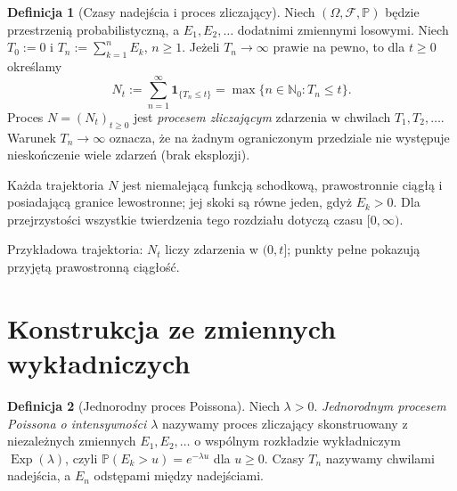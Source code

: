 \documentclass[11pt,a4paper,oneside]{report}
\numberwithin{equation}{chapter}
\theoremstyle{plain}
\theoremstyle{definition}
\newtheorem{definicja}{Definicja}[chapter]
\theoremstyle{remark}
\newcommand{\N}{\mathbb{N}}
\newcommand{\Prob}{\mathbb{P}}
\newcommand{\calF}{\mathcal{F}}
\newcommand{\ind}[1]{\mathbf{1}_{#1}}
\begin{document}
\begin{definicja}[Czasy nadejścia i proces zliczający]
Niech $(\Omega,\calF,\Prob)$ będzie przestrzenią probabilistyczną,
a $E_1,E_2,\ldots$ dodatnimi zmiennymi losowymi. Niech
$T_0:=0$ i $T_n:=\sum_{k=1}^n E_k$, $n\ge1$.
Jeżeli $T_n\to\infty$ prawie na pewno, to dla $t\ge0$ określamy
\[
N_t:=\sum_{n=1}^\infty\ind{\{T_n\le t\}}
      =\max\{n\in\N_0:T_n\le t\}.
\]
Proces $N=(N_t)_{t\ge0}$ jest \emph{procesem zliczającym} zdarzenia
w chwilach $T_1,T_2,\ldots$. Warunek $T_n\to\infty$ oznacza, że na
żadnym ograniczonym przedziale nie występuje nieskończenie wiele
zdarzeń (brak eksplozji).
\end{definicja}

Każda trajektoria $N$ jest niemalejącą funkcją schodkową, prawostronnie
ciągłą i posiadającą granice lewostronne; jej skoki są równe jeden,
gdyż $E_k>0$. Dla przejrzystości wszystkie twierdzenia tego rozdziału
dotyczą czasu $[0,\infty)$.

\begin{center}
\par\smallskip\small Przykładowa trajektoria: $N_t$ liczy zdarzenia w $(0,t]$;
punkty pełne pokazują przyjętą prawostronną ciągłość.
\end{center}

\section{Konstrukcja ze zmiennych wykładniczych}
\begin{definicja}[Jednorodny proces Poissona]
Niech $\lambda>0$. \emph{Jednorodnym procesem Poissona o intensywności
$\lambda$} nazywamy proces zliczający skonstruowany z niezależnych
zmiennych $E_1,E_2,\ldots$ o wspólnym rozkładzie wykładniczym
$\operatorname{Exp}(\lambda)$, czyli
$\Prob(E_k>u)=e^{-\lambda u}$ dla $u\ge0$.
Czasy $T_n$ nazywamy chwilami nadejścia, a $E_n$ odstępami między
nadejściami.
\end{definicja}
\end{document}

